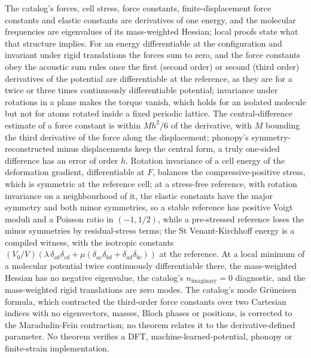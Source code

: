 \documentclass[11pt,a4paper]{article}
\begin{document}
The catalog's forces, cell stress, force constants, finite-displacement force constants and elastic constants are derivatives of one energy, and the molecular frequencies are eigenvalues of its mass-weighted Hessian; local proofs state what that structure implies. For an energy differentiable at the configuration and invariant under rigid translations the forces sum to zero, and the force constants obey the acoustic sum rules once the first (second order) or second (third order) derivatives of the potential are differentiable at the reference, as they are for a twice or three times continuously differentiable potential; invariance under rotations in a plane makes the torque vanish, which holds for an isolated molecule but not for atoms rotated inside a fixed periodic lattice. The central-difference estimate of a force constant is within $M h^2/6$ of the derivative, with $M$ bounding the third derivative of the force along the displacement; phonopy's symmetry-reconstructed minus displacements keep the central form, a truly one-sided difference has an error of order $h$. Rotation invariance of a cell energy of the deformation gradient, differentiable at $F$, balances the compressive-positive stress, which is symmetric at the reference cell; at a stress-free reference, with rotation invariance on a neighbourhood of it, the elastic constants have the major symmetry and both minor symmetries, so a stable reference has positive Voigt moduli and a Poisson ratio in $(-1, 1/2)$, while a pre-stressed reference loses the minor symmetries by residual-stress terms; the St Venant-Kirchhoff energy is a compiled witness, with the isotropic constants $(V_0/V)(\lambda\,\delta_{ab}\delta_{cd} + \mu(\delta_{ac}\delta_{bd} + \delta_{ad}\delta_{bc}))$ at the reference. At a local minimum of a molecular potential twice continuously differentiable there, the mass-weighted Hessian has no negative eigenvalue, the catalog's $n_{\mathrm{imaginary}} = 0$ diagnostic, and the mass-weighted rigid translations are zero modes. The catalog's mode Gr\"uneisen formula, which contracted the third-order force constants over two Cartesian indices with no eigenvectors, masses, Bloch phases or positions, is corrected to the Maradudin-Fein contraction; no theorem relates it to the derivative-defined parameter. No theorem verifies a DFT, machine-learned-potential, phonopy or finite-strain implementation.
\end{document}
